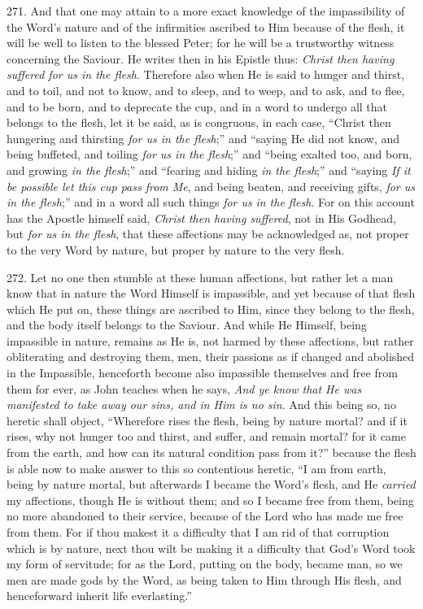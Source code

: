 271.
And that one may attain to a more exact knowledge of the impassibility
of the Word's nature and of the infirmities ascribed to Him because of
the flesh, it will be well to listen to the blessed Peter; for he will
be a trustworthy witness concerning the Saviour. He writes then in his
Epistle thus: \emph{Christ then having suffered for us in the flesh}.
Therefore also when He is said to hunger and thirst, and to toil, and
not to know, and to sleep, and to weep, and to ask, and to flee, and
to be born, and to deprecate the cup, and in a word to undergo all
that belongs to the flesh, let it be said, as is congruous, in each
case, ``Christ then hungering and thirsting \emph{for us in the flesh};''
and ``saying He did not know, and being buffeted, and toiling \emph{for us
in the flesh};'' and ``being exalted too, and born, and growing \emph{in
the flesh};'' and ``fearing and hiding \emph{in the flesh};'' and ``saying
\emph{If it be possible let this cup pass from Me}, and being beaten,
and receiving gifts, \emph{for us in the flesh};'' and in a word all
such things \emph{for us} \emph{in the flesh}. For on this
account has the Apostle himself said, \emph{Christ then having suffered},
not in His Godhead, but \emph{for us in the flesh}, that these
affections may be acknowledged as, not proper to the very Word by
nature, but proper by nature to the very flesh.

272.
Let no one then stumble at these human affections, but rather let a
man know that in nature the Word Himself is impassible, and yet
because of that flesh which He put on, these things are ascribed to
Him, since they belong to the flesh, and the body itself belongs to
the Saviour. And while He Himself, being impassible in nature, remains
as He is, not harmed by these affections, but rather obliterating and
destroying them, men, their passions as if changed and abolished in
the Impassible, henceforth become also impassible themselves and free
from them for ever, as John teaches when he says, \emph{And ye know that
He was manifested to take away our sins, and in Him is no sin}. And
this being so, no heretic shall object, ``Wherefore rises the flesh,
being by nature mortal? and if it rises, why not hunger too and
thirst, and suffer, and remain mortal? for it came from the earth, and
how can its natural condition pass from it?'' because the flesh is able
now to make answer to this so contentious heretic, ``I am from earth,
being by nature mortal, but afterwards I became the Word's flesh, and
He \emph{carried} my affections, though He is without them; and so I
became free from them, being no more abandoned to their service,
because of the Lord who has made me free from them. For if thou makest
it a difficulty that I am rid of that corruption which is by nature,
next thou wilt be making it a difficulty that God's Word took my form
of servitude; for as the Lord, putting on the body, became man, so we
men are made gods by the Word, as being taken to Him through His
flesh, and henceforward inherit life everlasting.''

